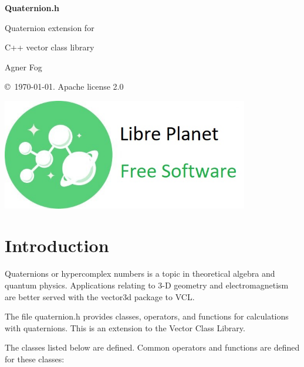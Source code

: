 \documentclass[11pt,a4paper,oneside,openright]{report}
\newcommand{\vspacesmall}{\vspace{3mm}}
\newcommand{\vspacebig}{\vspace{6mm}}
\begin{document}
\begin{titlepage}
    \centering
   
    \null %
    \vfill

   {\bfseries\Huge
    Quaternion.h
    \vspacesmall
    
    Quaternion extension for 
    \vspacesmall
        
    C++ vector class library 
    \vspacebig
        
   }        
    \vspacebig
    
   {\Large    
    Agner Fog
    \vspacebig
    
    \copyright\ \today. Apache license 2.0
   }
    
    \vfill
    
    \includegraphics[width=306pt]{freesoftwarelogo.jpg}
    \vfill
    
\end{titlepage}

\RaggedRight

\chapter{Introduction}\label{chap:Introduction}
Quaternions or hypercomplex numbers is a topic in theoretical algebra and quantum physics. Applications relating to 3-D geometry and electromagnetism are better served with the vector3d package to VCL.
\vspacesmall

The file quaternion.h provides classes, operators, and functions for 
calculations with quaternions. This is an extension to the Vector Class Library.
\vspacesmall

The classes listed below are defined. Common operators and functions are defined for these classes:
\end{document}
